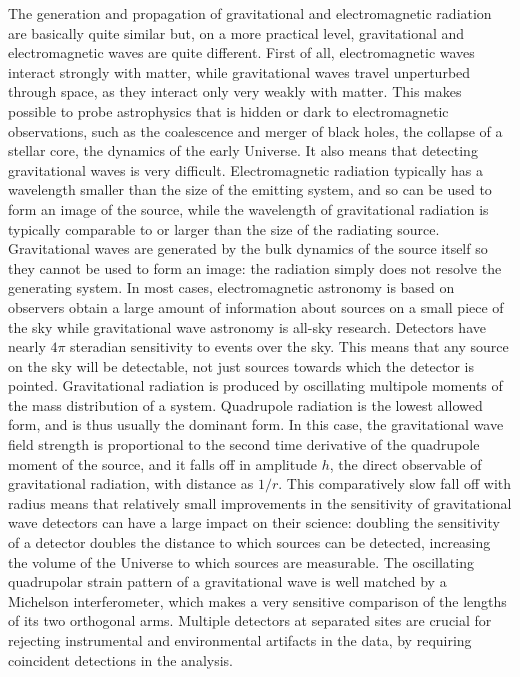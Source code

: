 \documentclass[binding=0.6cm, LaM]{sapthesis}
\begin{document}
	The generation and propagation of gravitational and electromagnetic radiation are basically quite similar but, 
	on a more practical level, gravitational and electromagnetic waves are quite different.
	First of all, electromagnetic waves interact strongly with matter, while gravitational waves travel unperturbed through space, 
	as they interact only very weakly with matter. This makes possible to probe astrophysics that is hidden or dark 
	to electromagnetic observations, such as the coalescence and merger of black holes, the collapse of a stellar core, 
	the dynamics of the early Universe. It also means that detecting gravitational waves is very difficult. 
	Electromagnetic radiation typically has a wavelength smaller than the size of the emitting system, 
	and so can be used to form an image of the source, while the wavelength of gravitational radiation is typically comparable 
	to or larger than the size of the radiating source. 
	Gravitational waves are generated by the bulk dynamics of the source itself so they cannot be used to form an image: 
	the radiation simply does not resolve the generating system. 
	In most cases, electromagnetic astronomy is based on observers obtain a large amount of information about sources on a small piece 
	of the sky while gravitational wave astronomy is all-sky research.
	Detectors have nearly $4\pi$ steradian sensitivity to events over the sky. This means that any source on the sky will be detectable, 
	not just sources towards which the detector is pointed.
	Gravitational radiation is produced by oscillating multipole moments of the mass distribution of a system. 
	Quadrupole radiation is the lowest allowed form, and is thus usually the dominant form. 
	In this case, the gravitational wave field strength is proportional to the second time derivative of the quadrupole moment of the source, 
	and it falls off in amplitude $h$, the direct observable of gravitational radiation, with distance as $1/r$. 
	This comparatively slow fall off with radius means that relatively small improvements in the sensitivity 
	of gravitational wave detectors can have a large impact on their science:
	doubling the sensitivity of a detector doubles the distance to which sources can be detected, 
	increasing the volume of the Universe to which sources are measurable.
	The oscillating quadrupolar strain pattern of a gravitational wave is well matched by a Michelson interferometer, 
	which makes a very sensitive comparison of the lengths of its two orthogonal arms. 
	Multiple detectors at separated sites are crucial for rejecting instrumental and environmental artifacts in the data, 
	by requiring coincident detections in the analysis. 
\end{document}
